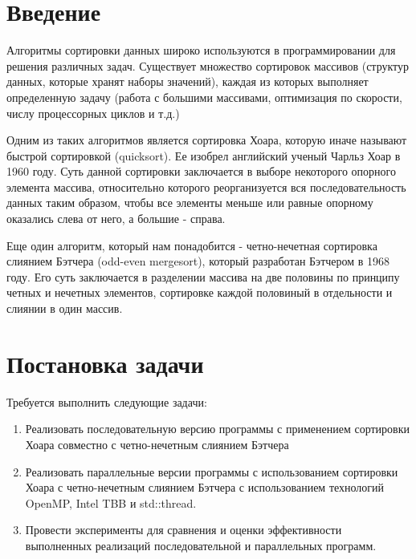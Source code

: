 \documentclass{report}
\begin{document}
\setcounter{page}{2}

\tableofcontents
\newpage

\section*{Введение}
\par Алгоритмы сортировки данных широко используются в программировании для решения различных задач. Существует множество сортировок массивов (структур данных, которые хранят наборы значений), каждая из которых выполняет определенную задачу (работа с большими массивами, оптимизация по скорости, числу процессорных циклов и т.д.)
\par Одним из таких алгоритмов является сортировка Хоара, которую иначе называют быстрой сортировкой (quicksort). Ее изобрел английский ученый Чарльз Хоар в 1960 году. Суть данной сортировки заключается в выборе некоторого опорного элемента массива, относительно которого реорганизуется вся последовательность данных таким образом, чтобы все элементы меньше или равные опорному оказались слева от него, а большие - справа.
\par Еще один алгоритм, который нам понадобится - четно-нечетная сортировка слиянием Бэтчера (odd-even mergesort), который разработан Бэтчером в 1968 году. Его суть заключается в разделении массива на две половины по принципу четных и нечетных элементов, сортировке каждой половиный в отдельности и слиянии в один массив.
\newpage

\section*{Постановка задачи}
\par Требуется выполнить следующие задачи:
\begin{enumerate}
    \item Реализовать последовательную версию программы с применением сортировки Хоара совместно с четно-нечетным слиянием Бэтчера
    \item Реализовать параллельные версии программы с использованием сортировки Хоара с четно-нечетным слиянием Бэтчера с использованием технологий OpenMP, Intel TBB и std::thread.
    \item Провести эксперименты для сравнения и оценки эффективности выполненных реализаций последовательной и параллельных программ.
\end{enumerate}
\par 
\newpage
\end{document}
